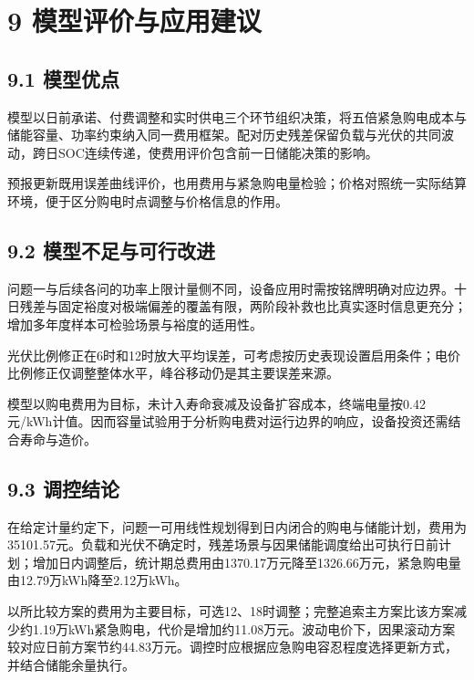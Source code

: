 \documentclass[UTF8,a4paper,zihao=-4,fontset=windows]{ctexart}
\begin{document}
\section{9 模型评价与应用建议}
\subsection{9.1 模型优点}
模型以日前承诺、付费调整和实时供电三个环节组织决策，将五倍紧急购电成本与储能容量、功率约束纳入同一费用框架。配对历史残差保留负载与光伏的共同波动，跨日SOC连续传递，使费用评价包含前一日储能决策的影响。
\par
预报更新既用误差曲线评价，也用费用与紧急购电量检验；价格对照统一实际结算环境，便于区分购电时点调整与价格信息的作用。
\par
\subsection{9.2 模型不足与可行改进}
问题一与后续各问的功率上限计量侧不同，设备应用时需按铭牌明确对应边界。十日残差与固定裕度对极端偏差的覆盖有限，两阶段补救也比真实逐时信息更充分；增加多年度样本可检验场景与裕度的适用性。
\par
光伏比例修正在6时和12时放大平均误差，可考虑按历史表现设置启用条件；电价比例修正仅调整整体水平，峰谷移动仍是其主要误差来源。
\par
模型以购电费用为目标，未计入寿命衰减及设备扩容成本，终端电量按0.42元/kWh计值。因而容量试验用于分析购电费对运行边界的响应，设备投资还需结合寿命与造价。
\par
\subsection{9.3 调控结论}
在给定计量约定下，问题一可用线性规划得到日内闭合的购电与储能计划，费用为35101.57元。负载和光伏不确定时，残差场景与因果储能调度给出可执行日前计划；增加日内调整后，统计期总费用由1370.17万元降至1326.66万元，紧急购电量由12.79万kWh降至2.12万kWh。
\par
以所比较方案的费用为主要目标，可选12、18时调整；完整追索主方案比该方案减少约1.19万kWh紧急购电，代价是增加约11.08万元。波动电价下，因果滚动方案较对应日前方案节约44.83万元。调控时应根据应急购电容忍程度选择更新方式，并结合储能余量执行。
\par
\clearpage
\end{document}
